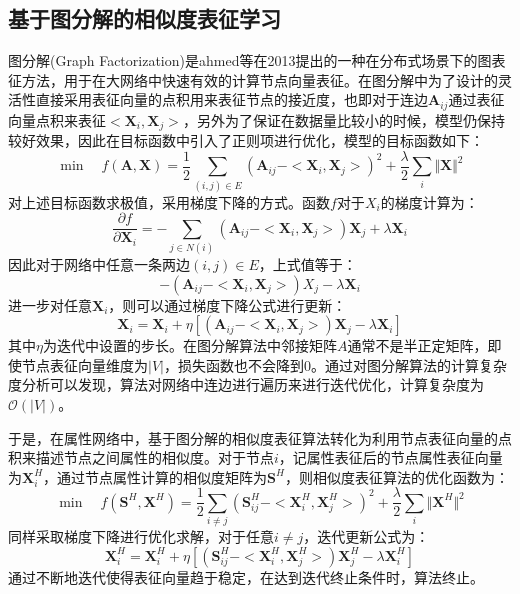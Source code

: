 \subsection{基于图分解的相似度表征学习}
图分解(Graph Factorization)\cite{ahmed2013distributed}是ahmed等在2013提出的一种在分布式场景下的图表征方法，用于在大网络中快速有效的计算节点向量表征。在图分解中为了设计的灵活性直接采用表征向量的点积用来表征节点的接近度，也即对于连边$\textbf{A}_{ij}$通过表征向量点积来表征$<\textbf{X}_i, \textbf{X}_j>$，另外为了保证在数据量比较小的时候，模型仍保持较好效果，因此在目标函数中引入了正则项进行优化，模型的目标函数如下：
\begin{equation}
	\min \quad f(\textbf{A}, \textbf{X})=\frac{1}{2} \sum_{(i,j)\in E}(\textbf{A}_{ij}-<\textbf{X}_i, \textbf{X}_j>)^2+\frac{\lambda}{2}\sum_i\Vert\textbf{X}\Vert^2
\end{equation}
对上述目标函数求极值，采用梯度下降的方式。函数$f$对于$X_i$的梯度计算为：
\begin{equation}
\frac{\partial f}{\partial \textbf{X}_i} = -\sum_{j\in N(i)} (\textbf{A}_{ij}-<\textbf{X}_i,\textbf{X}_j>)\textbf{X}_j+\lambda \textbf{X}_i
\end{equation}
因此对于网络中任意一条两边$(i,j)\in E$，上式值等于：
\begin{equation}
	-(\textbf{A}_{ij}-<\textbf{X}_i, \textbf{X}_j>)X_j - \lambda \textbf{X}_i
\end{equation}
进一步对任意$\textbf{X}_i$，则可以通过梯度下降公式进行更新：
\begin{equation}
	\textbf{X}_i = \textbf{X}_i + \eta [(\textbf{A}_{ij}-<\textbf{X}_i, \textbf{X}_j>)\textbf{X}_j - \lambda \textbf{X}_i]
\end{equation}
其中$\eta$为迭代中设置的步长。在图分解算法中邻接矩阵$A$通常不是半正定矩阵，即使节点表征向量维度为$|V|$，损失函数也不会降到0。通过对图分解算法的计算复杂度分析可以发现，算法对网络中连边进行遍历来进行迭代优化，计算复杂度为$\mathcal{O}(|V|)$。

于是，在属性网络中，基于图分解的相似度表征算法转化为利用节点表征向量的点积来描述节点之间属性的相似度。对于节点$i$，记属性表征后的节点属性表征向量为$\textbf{X}_i^H$，通过节点属性计算的相似度矩阵为$\textbf{S}^H$，则相似度表征算法的优化函数为：
\begin{equation}
\min \quad f(\textbf{S}^H, \textbf{X}^H)=\frac{1}{2} \sum_{i\ne j}(\textbf{S}^H_{ij}-<\textbf{X}^H_i, \textbf{X}^H_j>)^2+\frac{\lambda}{2}\sum_i\Vert\textbf{X}^H\Vert^2
\end{equation}
同样采取梯度下降进行优化求解，对于任意$i\ne j$，迭代更新公式为：
\begin{equation}
	\textbf{X}^H_i = \textbf{X}^H_i + \eta [(\textbf{S}^H_{ij}-<\textbf{X}^H_i, \textbf{X}^H_j>)\textbf{X}^H_j - \lambda \textbf{X}^H_i]
\end{equation}
通过不断地迭代使得表征向量趋于稳定，在达到迭代终止条件时，算法终止。


